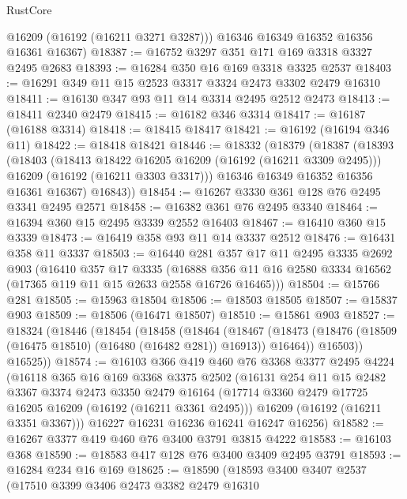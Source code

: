 \begin{lexlean}{RustCore}
\begin{coremodule}
        @16209
        (@16192 (@16211 @3271 @3287)))
      @16346
      @16349
      @16352
      @16356
      @16361
      @16367)
@18387 := @16752 @3297 @351 @171 @169 @3318 @3327 @2495 @2683
@18393 := @16284 @350 @16 @169 @3318 @3325 @2537
@18403 := @16291 @349 @11 @15 @2523 @3317 @3324 @2473 @3302 @2479 @16310
@18411 := @16130 @347 @93 @11 @14 @3314 @2495 @2512 @2473
@18413 := @18411 @2340 @2479
@18415 := @16182 @346 @3314
@18417 := @16187 (@16188 @3314)
@18418 := @18415 @18417
@18421 := @16192 (@16194 @346 @11)
@18422 := @18418 @18421
@18446 := @18332
    (@18379
      (@18387
        (@18393
          (@18403
            (@18413 @18422 @16205 @16209 (@16192 (@16211 @3309 @2495)))
            @16209
            (@16192 (@16211 @3303 @3317)))
          @16346
          @16349
          @16352
          @16356
          @16361
          @16367)
        @16843))
@18454 := @16267 @3330 @361 @128 @76 @2495 @3341 @2495 @2571
@18458 := @16382 @361 @76 @2495 @3340
@18464 := @16394 @360 @15 @2495 @3339 @2552 @16403
@18467 := @16410 @360 @15 @3339
@18473 := @16419 @358 @93 @11 @14 @3337 @2512
@18476 := @16431 @358 @11 @3337
@18503 := @16440
    @281
    @357
    @17
    @11
    @2495
    @3335
    @2692
    @903
    (@16410
      @357
      @17
      @3335
      (@16888 @356 @11 @16 @2580 @3334 @16562 (@17365 @119 @11 @15 @2633 @2558 @16726 @16465)))
@18504 := @15766 @281
@18505 := @15963 @18504
@18506 := @18503 @18505
@18507 := @15837 @903
@18509 := @18506 (@16471 @18507)
@18510 := @15861 @903
@18527 := @18324
    (@18446
      (@18454
        (@18458
          (@18464
            (@18467 (@18473 (@18476 (@18509 (@16475 @18510) (@16480 (@16482 @281)) @16913)) @16464))
            @16503))
        @16525))
@18574 := @16103
    @366
    @419
    @460
    @76
    @3368
    @3377
    @2495
    @4224
    (@16118
      @365
      @16
      @169
      @3368
      @3375
      @2502
      (@16131
        @254
        @11
        @15
        @2482
        @3367
        @3374
        @2473
        @3350
        @2479
        @16164
        (@17714 @3360 @2479 @17725 @16205 @16209 (@16192 (@16211 @3361 @2495)))
        @16209
        (@16192 (@16211 @3351 @3367)))
      @16227
      @16231
      @16236
      @16241
      @16247
      @16256)
@18582 := @16267 @3377 @419 @460 @76 @3400 @3791 @3815 @4222
@18583 := @16103 @368
@18590 := @18583 @417 @128 @76 @3400 @3409 @2495 @3791
@18593 := @16284 @234 @16 @169
@18625 := @18590
    (@18593
      @3400
      @3407
      @2537
      (@17510
        @3399
        @3406
        @2473
        @3382
        @2479
        @16310

\end{coremodule}
\end{lexlean}
